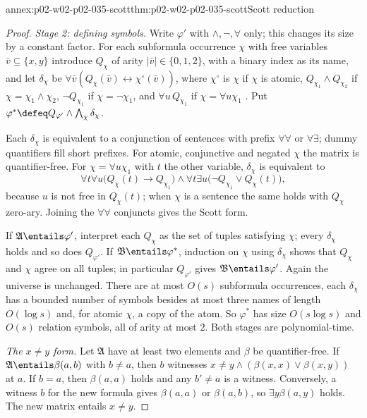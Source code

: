 \begin{annexitem}{annex:p02-w02-p02-035-scott}{thm:p02-w02-p02-035-scott}{Scott reduction}
\begin{proof}
\emph{Stage 2: defining symbols.}  Write \(\varphi'\) with \(\land,\neg,\forall\)
only; this changes its size by a constant factor.  For each subformula
occurrence \(\chi\) with free variables \(\bar v\subseteq\{x,y\}\) introduce
\(Q_\chi\) of arity \(\lvert\bar v\rvert\in\{0,1,2\}\), with a binary index as
its name, and let \(\delta_\chi\) be
\(\forall\bar v(Q_\chi(\bar v)\leftrightarrow\chi^{\circ}(\bar v))\), where
\(\chi^{\circ}\) is \(\chi\) if \(\chi\) is atomic, \(Q_{\chi_1}\land
Q_{\chi_2}\) if \(\chi=\chi_1\land\chi_2\), \(\neg Q_{\chi_1}\) if
\(\chi=\neg\chi_1\), and \(\forall u\,Q_{\chi_1}\) if \(\chi=\forall u\chi_1\)
\cite[pp.~5--6]{GradelKolaitisVardi1997}.  Put
\(\varphi^{*}\defeq Q_{\varphi'}\land\bigwedge_\chi\delta_\chi\).

Each \(\delta_\chi\) is equivalent to a conjunction of sentences with prefix
\(\forall\forall\) or \(\forall\exists\); dummy quantifiers fill short
prefixes.  For atomic, conjunctive and negated \(\chi\) the matrix is
quantifier-free.  For \(\chi=\forall u\chi_1\) with \(t\) the other variable,
\(\delta_\chi\) is equivalent to
\[
 \forall t\forall u\bigl(Q_\chi(t)\to Q_{\chi_1}\bigr)\land
 \forall t\exists u\bigl(\neg Q_{\chi_1}\lor Q_\chi(t)\bigr),
\]
because \(u\) is not free in \(Q_\chi(t)\); when \(\chi\) is a sentence the
same holds with \(Q_\chi\) zero-ary.  Joining the \(\forall\forall\) conjuncts
gives the Scott form.

If \(\mathfrak A\entails\varphi'\), interpret each \(Q_\chi\) as the set of
tuples satisfying \(\chi\); every \(\delta_\chi\) holds and so does
\(Q_{\varphi'}\).  If \(\mathfrak B\entails\varphi^{*}\), induction on \(\chi\)
using \(\delta_\chi\) shows that \(Q_\chi\) and \(\chi\) agree on all tuples;
in particular \(Q_{\varphi'}\) gives \(\mathfrak B\entails\varphi'\).  Again
the universe is unchanged.  There are at most \(O(s)\) subformula occurrences,
each \(\delta_\chi\) has a bounded number of symbols besides at most three
names of length \(O(\log s)\) and, for atomic \(\chi\), a copy of the atom.  So
\(\varphi^{*}\) has size \(O(s\log s)\) and \(O(s)\) relation symbols, all of
arity at most \(2\).  Both stages are polynomial-time.

\emph{The \(x\neq y\) form.}  Let \(\mathfrak A\) have at least two elements
and \(\beta\) be quantifier-free.  If \(\mathfrak A\entails\beta(a,b)\) with
\(b\neq a\), then \(b\) witnesses \(x\neq y\land(\beta(x,x)\lor\beta(x,y))\)
at \(a\).  If \(b=a\), then \(\beta(a,a)\) holds and any \(b'\neq a\) is a
witness.  Conversely, a witness \(b\) for the new formula gives
\(\beta(a,a)\) or \(\beta(a,b)\), so \(\exists y\beta(a,y)\) holds.  The new
matrix entails \(x\neq y\).
\end{proof}
\end{annexitem}

